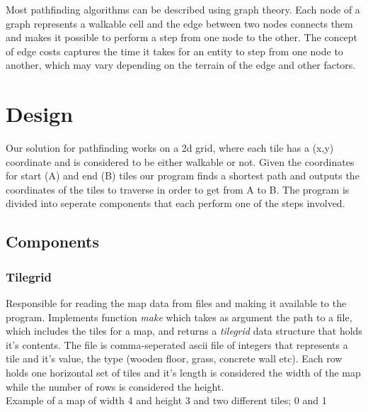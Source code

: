 \documentclass[12pt, a4paper]{article}
\begin{document}
Most pathfinding algorithms can be described using graph theory. Each node of a
graph represents a walkable cell and the edge between two nodes connects them
and makes it possible to perform a step from one node to the other. The concept
of edge costs captures the time it takes for an entity to step from one node to
another, which may vary depending on the terrain of the edge and other factors.






\section{Design}
Our solution for pathfinding works on a 2d grid, where each tile has a (x,y) coordinate and is considered to be either walkable or not. Given the coordinates for start (A) and end (B) tiles our program finds a shortest path and outputs the coordinates of the tiles to traverse in order to get from A to B. The program is divided into seperate components that each perform one of the steps involved.

\subsection{Components}
\subsubsection{Tilegrid}

Responsible for reading the map data from files and making it available to the program. Implements function \textit{make} which takes as argument the path to a file, which includes the tiles for a map, and returns a \textit{tilegrid} data structure that holds it's contents. The file is comma-seperated ascii file of integers that represents a tile and it's value, the type (wooden floor, grass, concrete wall etc). Each row holds one horizontal set of tiles and it's length is considered the width of the map while the number of rows is considered the height.
\\Example of a map of width 4 and height 3 and two different tiles; 0 and 1
\end{document}
